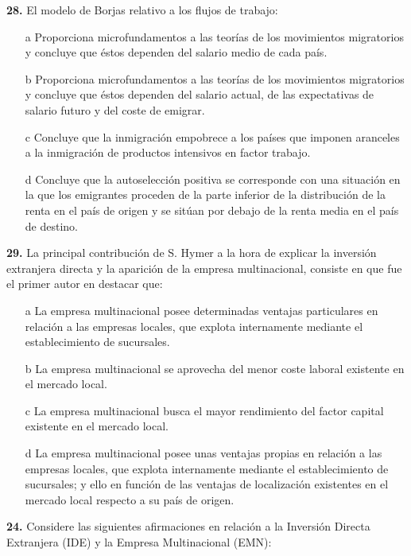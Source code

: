 \documentclass{nuevotema}
\begin{document}

\textbf{28.} El modelo de Borjas relativo a los flujos de trabajo:

\begin{itemize}
	\item[a] Proporciona microfundamentos a las teorías de los movimientos migratorios y concluye que éstos dependen del salario medio de cada país.
	\item[b] Proporciona microfundamentos a las teorías de los movimientos migratorios y concluye que éstos dependen del salario actual, de las expectativas de salario futuro y del coste de emigrar.
	\item[c] Concluye que la inmigración empobrece a los países que imponen aranceles a la inmigración de productos intensivos en factor trabajo.
	\item[d] Concluye que la autoselección positiva se corresponde con una situación en la que los emigrantes proceden de la parte inferior de la distribución de la renta en el país de origen y se sitúan por debajo de la renta media en el país de destino.
\end{itemize}


\textbf{29.} La principal contribución de S. Hymer a la hora de explicar la inversión extranjera directa y la aparición de la empresa multinacional, consiste en que fue el primer autor en destacar que:
\begin{itemize}
	\item[a] La empresa multinacional posee determinadas ventajas particulares en relación a las empresas locales, que explota internamente mediante el establecimiento de sucursales.
	\item[b] La empresa multinacional se aprovecha del menor coste laboral existente en el mercado local.
	\item[c] La empresa multinacional busca el mayor rendimiento del factor capital existente en el mercado local.
	\item[d] La empresa multinacional posee unas ventajas propias en relación a las empresas locales, que explota internamente mediante el establecimiento de sucursales; y ello en función de las ventajas de localización existentes en el mercado local respecto a su país de origen.
\end{itemize}


\textbf{24.} Considere las siguientes afirmaciones en relación a la Inversión Directa Extranjera (IDE) y la Empresa Multinacional (EMN):
\end{document}
